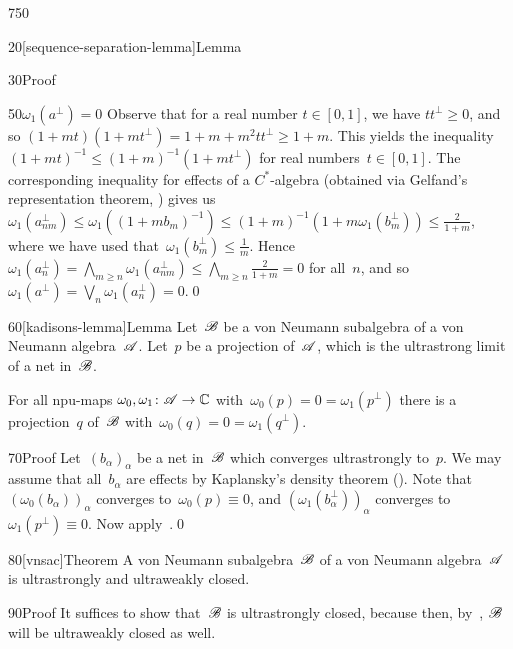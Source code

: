 \begin{parsec}{750}
\begin{point}{20}[sequence-separation-lemma]{Lemma}
\begin{point}{30}{Proof}
\begin{point}{50}{$\omega_1(a^\perp )=0$}
Observe that for a real number $t\in[0,1]$,
we have $tt^\perp \geq 0$,
and so $(1+mt)(1+mt^\perp) = 1+m+m^2tt^\perp \geq 1+m$.
This yields the inequality $(1+mt)^{-1}\leq (1+m)^{-1}(1+mt^\perp)$
for real numbers~$t\in[0,1]$.
The corresponding inequality for effects of a $C^*$-algebra
(obtained via Gelfand's representation theorem, )
gives us $\omega_1(a_{nm}^\perp)\leq \omega_1((1+mb_m)^{-1})
\leq (1+m)^{-1}(1+m\omega_1(b_m^\perp))\leq \frac{2}{1+m}$,
where we have used that~$\omega_1(b_m^\perp)\leq \frac{1}{m}$.
Hence~$\omega_1(a_n^\perp)=\bigwedge_{m\geq n} \omega_1(a_{nm}^\perp)
\leq \bigwedge_{m\geq n} \frac{2}{1+m}=0$ for all~$n$,
and so~$\omega_1(a^\perp)=\bigvee_n\omega_1(a_n^\perp)=0$.\qed
\end{point}
\end{point}
\end{point}
\begin{point}{60}[kadisons-lemma]{Lemma}%
Let~$\mathscr{B}$ be a von Neumann subalgebra
of a von Neumann algebra~$\mathscr{A}$.
Let~$p$ be a projection of~$\mathscr{A}$,
which is the ultrastrong limit of a net in~$\mathscr{B}$.

For all npu-maps $\omega_0,\omega_1\colon \mathscr{A}\to\mathbb{C}$
with~$\omega_0(p)=0= \omega_1(p^\perp)$
there is a projection~$q$ of~$\mathscr{B}$
with~$\omega_0(q)=0=\omega_1(q^\perp)$.
\begin{point}{70}{Proof}%
Let~$(b_\alpha)_\alpha$ be a net in~$\mathscr{B}$
which converges ultrastrongly to~$p$.
We may assume that all~$b_\alpha$
are effects
by Kaplansky's density theorem ().
Note that~$(\omega_0(b_\alpha))_\alpha$ converges to~$\omega_0(p)\equiv 0$,
and $(\omega_1(b^\perp_\alpha))_\alpha$ converges 
to~$\omega_1(p^\perp)\equiv 0$.
Now apply~.\qed
\end{point}
\end{point}
\begin{point}{80}[vnsac]{Theorem}%
A von Neumann subalgebra~$\mathscr{B}$ of a von Neumann algebra~$\mathscr{A}$
is ultrastrongly and ultraweakly closed.
\begin{point}{90}{Proof}%
It suffices to show that~$\mathscr{B}$ is ultrastrongly closed,
because then, by~, $\mathscr{B}$ will be ultraweakly closed
as well.


\end{point}
\end{point}
\end{parsec}
